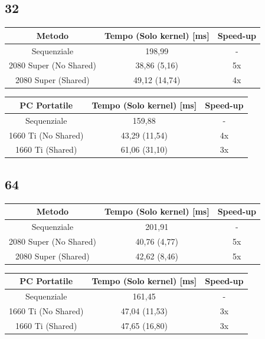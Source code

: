 \documentclass[12pt,a4paper]{report}
\begin{document}
			\subsection{32}
			
				\begin{tabular}{|c|c|c|}
					\hline
					Metodo & Tempo (Solo kernel) [ms] & Speed-up \\
					\hline
					Sequenziale & 198,99 & -  \\
					\hline
					2080 Super (No Shared) & 38,86 (5,16) & 5x \\
					\hline
					2080 Super (Shared) & 49,12 (14,74) & 4x \\
					\hline
				\end{tabular}
				
				\bigbreak
				
				\begin{tabular}{|c|c|c|}
					\hline
					PC Portatile & Tempo (Solo kernel) [ms] & Speed-up \\
					\hline
					Sequenziale & 159,88 & -  \\
					\hline
					1660 Ti (No Shared) & 43,29 (11,54) & 4x \\
					\hline
					1660 Ti (Shared) & 61,06 (31,10) & 3x \\
					\hline
				\end{tabular}

			\subsection{64}
			
				\begin{tabular}{|c|c|c|}
					\hline
					Metodo & Tempo (Solo kernel) [ms] & Speed-up \\
					\hline
					Sequenziale & 201,91 & -  \\
					\hline
					2080 Super (No Shared) & 40,76 (4,77) & 5x \\
					\hline
					2080 Super (Shared) & 42,62 (8,46) & 5x \\
					\hline
				\end{tabular}
				
				\bigbreak
				
				\begin{tabular}{|c|c|c|}
					\hline
					PC Portatile & Tempo (Solo kernel) [ms] & Speed-up \\
					\hline
					Sequenziale & 161,45 & -  \\
					\hline
					1660 Ti (No Shared) & 47,04 (11,53) & 3x \\
					\hline
					1660 Ti (Shared) & 47,65 (16,80) & 3x \\
					\hline
				\end{tabular}
\end{document}
